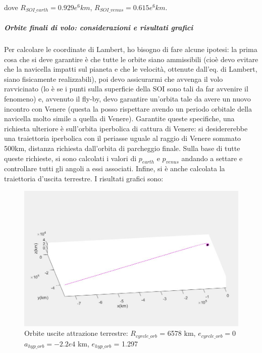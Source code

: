 \documentclass[a4paper]{article}
\begin{document}
dove $R_{SOI\_earth} = 0.929e^{6}km$,  $R_{SOI\_venus} = 0.615e^{6}km$.
\subparagraph{Orbite finali di volo: considerazioni e risultati grafici\newline}
Per calcolare le coordinate di Lambert, ho bisogno di fare alcune ipotesi: la prima cosa che si deve garantire è che tutte le orbite siano ammissibili (cioè devo evitare che la navicella impatti sul pianeta e che le velocità, ottenute dall'eq. di Lambert, siano fisicamente realizzabili), poi devo assicurarmi che avvenga il volo ravvicinato (lo è se i punti sulla superficie della SOI sono tali da far avvenire il fenomeno) e, avvenuto il fly-by, devo garantire un'orbita tale da avere un nuovo incontro con Venere (questa la posso rispettare avendo un periodo orbitale della navicella molto simile a quella di Venere). \newline Garantite queste specifiche, una richiesta ulteriore è sull'orbita iperbolica di cattura di Venere: si desidererebbe una traiettoria iperbolica con il periasse uguale al raggio di Venere sommato 500km, distanza richiesta dall'orbita di parcheggio finale. \newline Sulla base di tutte queste richieste, si sono calcolati i valori di \textit{$p_{earth}$} e \textit{$p_{venus}$} andando a settare e controllare tutti gli angoli a essi associati. \newline Infine, si è anche calcolata la traiettoria d'uscita terrestre.
I risultati grafici sono:
\begin{figure}[htbp]
\includegraphics[width=1\textwidth]{Uscita_SOI_terra.png}
\caption{Orbite uscite attrazione terrestre: \newline $R_{cyrcle\_orb}$ = 6578 km, $e_{cyrcle\_orb} = 0$ \newline $a_{hyp\_orb} = -2.2e4$ km, $e_{hyp\_orb}$ = 1.297}
\end{figure}\newline
\end{document}
